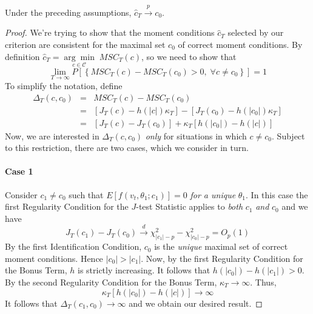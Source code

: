 \begin{thm}
	Under the preceding assumptions, $\widehat{c}_T \overset{p}{\rightarrow} c_0$.
\end{thm}
\begin{proof}
We're trying to show that the moment conditions $\widehat{c}_T$ selected by our criterion are consistent for the maximal set $c_0$ of correct moment conditions. By definition $\widehat{c}_T = \underset{c\in \mathcal{C}}{\arg \min} \; MSC_T(c)$, so we need to show that
	$$\lim_{T\rightarrow \infty} P\left[\left\{MSC_T(c) - MSC_T(c_0)>0, \; \forall c \neq c_0\right\} \right] = 1$$
To simplify the notation, define
	\begin{eqnarray*}
		\Delta_T(c, c_0) &=& MSC_T(c) - MSC_T(c_0)\\
						&=& \left[J_T(c) -h(|c|)\kappa_T \right] - \left[J_T(c_0) -h(|c_0|)\kappa_T \right]\\
						&=& \left[J_T(c) - J_T(c_0)\right] + \kappa_T \left[h(|c_0|) - h(|c|) \right]
	\end{eqnarray*}
Now, we are interested in $\Delta_T(c, c_0)$ \emph{only} for situations in which $c\neq c_0$. Subject to this restriction, there are two cases, which we consider in turn. 
\paragraph{Case 1} Consider $c_1\neq c_0$ such that $E[f(v_t, \theta_1;c_1)]=0$ \emph{for a unique} $\theta_1$. In this case the first Regularity Condition for the $J$-test Statistic applies to \emph{both} $c_1$ \emph{and} $c_0$ and we have 
	$$J_T(c_1) - J_T(c_0) \overset{d}{\rightarrow} \chi^2_{|c_1| - p} - \chi^2_{|c_0|-p} = O_p(1)$$
By the first Identification Condition, $c_0$ is the \emph{unique} maximal set of correct moment conditions. Hence $|c_0| > |c_1|$. Now, by the first Regularity Condition for the Bonus Term, $h$ is strictly increasing. It follows that $h(|c_0|) - h(|c_1|)>0$. By the second Regularity Condition for the Bonus Term, $\kappa_T \rightarrow \infty$. Thus, 
	$$\kappa_T \left[h(|c_0|) - h(|c|) \right] \rightarrow \infty$$ 
It follows that $\Delta_T(c_1, c_0) \rightarrow \infty$ and we obtain our desired result.



\end{proof}
